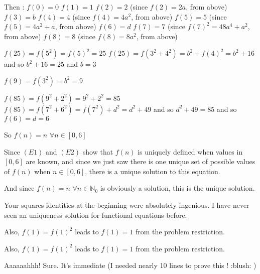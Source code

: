 \begin{solution}
Then :
$ f(0)=0$
$ f(1)=1$
$ f(2)=2$ (since $ f(2)=2a$, from above)
$ f(3)=b$
$ f(4)=4$ (since $ f(4)=4a^2$, from above)
$ f(5)=5$ (since $ f(5)=4a^2+a$, from above)
$ f(6)=d$
$ f(7)=7$ (since $ f(7)^2=48a^4+a^2$, from above)
$ f(8)=8$ (since $ f(8)=8a^2$, from above)

$ f(25)=f(5^2)=f(5)^2=25$
$ f(25)=f(3^2+4^2)=b^2+f(4)^2=b^2+16$ and so $ b^2+16=25$ and $ b=3$

$ f(9)=f(3^2)=b^2=9$

$ f(85)=f(9^2+2^2)=9^2+2^2=85$
$ f(85)=f(7^2+6^2)=f(7^2)+d^2=d^2+49$ and so $ d^2+49=85$ and so $ f(6)=d=6$

So $ f(n)=n$ $ \forall n\in[0,6]$

Since $ (E1)$ and $ (E2)$ show that $ f(n)$ is uniquely defined when values in $ [0,6]$ are known, and since we just saw there is one unique set of possible values of $ f(n)$ when $ n\in[0,6]$, there is a unique solution to this equation.

And since $ f(n)=n$ $ \forall n\in\mathbb{N}_0$ is obviously a solution, this is the unique solution.
\end{solution}



\begin{solution}
	Your squares identities at the beginning were absolutely ingenious. I have never seen an uniqueness solution for functional equations before.

Also, $ f(1) = f(1)^2$ leads to $ f(1) = 1$ from the problem restriction.
\end{solution}



\begin{solution}
	\begin{tcolorbox} Also, $ f(1) = f(1)^2$ leads to $ f(1) = 1$ from the problem restriction.\end{tcolorbox}

Aaaaaahhh! Sure. It's immediate (I needed nearly 10 lines to prove this ! :blush: )
\end{solution}



